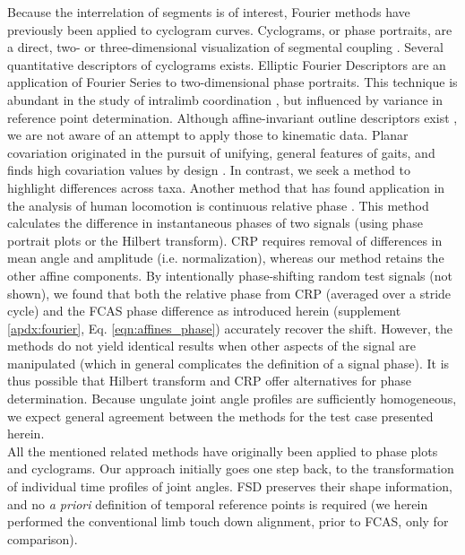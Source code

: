 Because the interrelation of segments is of interest, Fourier methods have previously been applied to cyclogram curves.
Cyclograms, or phase portraits, are a direct, two- or three-dimensional visualization of segmental coupling \citep{Bernstein1934,Goswami1998,DAout2002}.
Several quantitative descriptors of cyclograms exists.
Elliptic Fourier Descriptors \citep{Kuhl1982,Wheat2006} are an application of Fourier Series to two-dimensional phase portraits.
This technique is abundant in the study of intralimb coordination \citep[e.g.][]{Polk2008,HsiaoWecksler2010,Rosengren2009}, but influenced by variance in reference point determination.
Although affine-invariant outline descriptors exist \citep[e.g.][]{Arbter1990}, we are not aware of an attempt to apply those to kinematic data.
Planar covariation \citep{Borghese1996,Hallemans2009,Ogihara2014} originated in the pursuit of unifying, general features of gaits, and finds high covariation values by design \citep[choice of segment angles, common temporal swing/stance structure for these, use of PCA;][]{Hicheur2006,Ivanenko2008}.
In contrast, we seek a method to highlight differences across taxa.
Another method that has found application in the analysis of human locomotion is continuous relative phase \citep[CRP, \textit{cf.}][]{Lamb2014}.
This method calculates the difference in instantaneous phases of two signals (using phase portrait plots or the Hilbert transform).
CRP requires removal of differences in mean  angle and amplitude (i.e. normalization), whereas our method retains the other affine components.
By intentionally phase-shifting random test signals (not shown), we found that both the relative phase from CRP (averaged over a stride cycle) and the FCAS phase difference as introduced herein (supplement \ref*{apdx:fourier}, Eq. \ref*{eqn:affines_phase}) accurately recover the shift.
However, the methods do not yield identical results when other aspects of the signal are manipulated (which in general complicates the definition of a signal phase).
It is thus possible that Hilbert transform and CRP offer alternatives for phase determination.
Because ungulate joint angle profiles are sufficiently homogeneous, we expect general agreement between the methods for the test case presented herein.
\\All the mentioned related methods have originally been applied to phase plots and cyclograms.
Our approach initially goes one step back, to the transformation of individual time profiles of joint angles.
FSD preserves their shape information, and no \textit{a priori} definition of temporal reference points is required (we herein performed the conventional limb touch down alignment, prior to FCAS, only for comparison).
